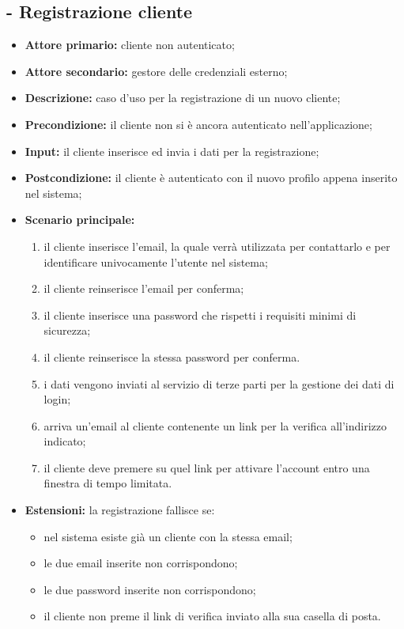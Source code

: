 \subsection{ - Registrazione cliente}
\begin{itemize}
    \item \textbf{Attore primario:} cliente non autenticato;
    \item \textbf{Attore secondario:} gestore delle credenziali esterno;
    \item \textbf{Descrizione:} caso d'uso per la registrazione di un nuovo cliente;
    \item \textbf{Precondizione:} il cliente non si è ancora autenticato nell'applicazione;
    \item \textbf{Input:} il cliente inserisce ed invia i dati per la registrazione;
    \item \textbf{Postcondizione:} il cliente è autenticato con il nuovo profilo appena inserito nel sistema;
    \item \textbf{Scenario principale:}
    \begin{enumerate}
        \item il cliente inserisce l'email, la quale verrà utilizzata per contattarlo e per identificare univocamente l'utente nel sistema;
        \item il cliente reinserisce l'email per conferma;
        \item il cliente inserisce una password che rispetti i requisiti minimi di sicurezza;
        \item il cliente reinserisce la stessa password per conferma.
        \item i dati vengono inviati al servizio di terze parti per la gestione dei dati di login;
        \item arriva un'email al cliente contenente un link per la verifica all'indirizzo indicato;
        \item il cliente deve premere su quel link per attivare l'account entro una finestra di tempo limitata.
    \end{enumerate}
    \item \textbf{Estensioni:} la registrazione fallisce se:
    \begin{itemize}
        \item nel sistema esiste già un cliente con la stessa email;
        \item le due email inserite non corrispondono;
        \item le due password inserite non corrispondono;
        \item il cliente non preme il link di verifica inviato alla sua casella di posta.
    \end{itemize}
\end{itemize}

